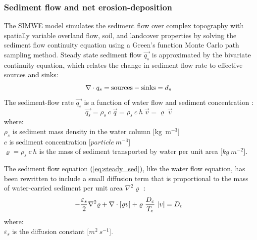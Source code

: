 \documentclass[gmd, manuscript]{copernicus}
\begin{document}

\subsubsection{Sediment flow and net erosion-deposition}

The SIMWE model simulates the sediment flow over complex topography 
with spatially variable overland flow, soil, and landcover properties 
by solving  the sediment flow continuity equation
using a Green's function Monte Carlo path sampling method.
Steady state sediment flow $\vec{q_s}$ is approximated by
the bivariate continuity equation, which relates 
the change in sediment flow rate to effective sources and sinks:
%
\begin{equation}
\label{eq:steady_sed}
\nabla\cdot \vec{q_s} = {\rm sources - sinks}= d_s
\end{equation}
%
\noindent
The sediment-flow rate $\vec{q_s}$ 
is a function of water flow and sediment concentration
\citep{Mitas1998}: %
%
\begin{equation}
\label{eq:sedflow}
\vec{q_s} = \rho_s~c~\vec{q} = \rho_s~c~h~\vec{v} = \varrho~\vec{v}
\end{equation}
{\small
\noindent
where: \\
\hspace*{0.5em} $\rho_s$ is sediment mass density in the water column [\unit{kg~m}$^{-3}$]\\
\hspace*{0.5em} $c$ is sediment concentration [$\unit{particle~m^{-3}}$]\\
\hspace*{0.5em} $\varrho = \rho_s~c~h$ is the mass of sediment transported by water per unit area [$\unit{kg~m^{-2}}$]. 
}

The sediment flow equation (\ref{eq:steady_sed}),
like the water flow equation, 
has been rewritten to include a small diffusion term that is
proportional to the mass of water-carried sediment per unit area 
$\nabla^2 \varrho$ \citep{Mitas1998}:
\begin{equation}
\label{eq:difsedim}
-{\varepsilon_s \over 2}\nabla^2 \varrho
+ \nabla\cdot [\varrho \vec{v}]
 + \varrho~{D_c \over T_c}~|\vec{v}|
= D_c
\end{equation}
{\small
\noindent
where:\\
\noindent
\hspace*{0.5em} $\varepsilon_s$ is the diffusion constant [$\unit{m^2~s^{-1}}$].\\
}
\end{document}
